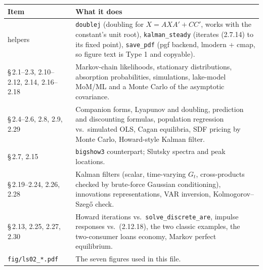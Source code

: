 \documentclass[12pt, letterpaper]{article}
\begin{document}
\begin{center}
\begin{tabular}{@{}p{3.6cm}p{11.2cm}@{}}
\toprule
\textbf{Item} & \textbf{What it does} \\
\midrule
helpers & \texttt{doublej} (doubling for $X=AXA'+CC'$, works with the constant's unit root),
\texttt{kalman\_steady} (iterates (2.7.14) to its fixed point), \texttt{save\_pdf} (pgf backend,
lmodern + cmap, so figure text is Type 1 and copyable). \\
\S\,2.1--2.3, 2.10--2.12, 2.14, 2.16--2.18 & Markov-chain likelihoods, stationary distributions,
absorption probabilities, simulations, lake-model MoM/ML and a Monte Carlo of the asymptotic covariance. \\
\S\,2.4--2.6, 2.8, 2.9, 2.29 & Companion forms, Lyapunov and doubling, prediction and discounting formulas,
population regression vs.\ simulated OLS, Cagan equilibria, SDF pricing by Monte Carlo, Howard-style
Kalman filter. \\
\S\,2.7, 2.15 & \texttt{bigshow3} counterpart; Slutsky spectra and peak locations. \\
\S\,2.19--2.24, 2.26, 2.28 & Kalman filters (scalar, time-varying $G_t$, cross-products checked by
brute-force Gaussian conditioning), innovations representations, VAR inversion, Kolmogorov--Szeg\H{o}
check. \\
\S\,2.13, 2.25, 2.27, 2.30 & Howard iterations vs.\ \texttt{solve\_discrete\_are}, impulse responses vs.\
(2.12.18), the two classic examples, the two-consumer loans economy, Markov perfect equilibrium. \\
\texttt{fig/ls02\_*.pdf} & The seven figures used in this file. \\
\bottomrule
\end{tabular}
\end{center}
\end{document}
